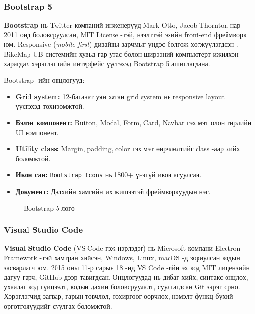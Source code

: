\subsubsection{Bootstrap 5}
\par
\textbf{Bootstrap} нь Twitter компаний инженерүүд Mark Otto, Jacob Thornton нар 2011 онд боловсруулсан, MIT License -тэй, нээлттэй эхийн front-end фреймворк юм. Responsive (\textit{mobile-first}) дизайны зарчмыг үндэс болгож хөгжүүлэгдсэн \cite{bootstrap}. BikeMap UB системийн хувьд гар утас болон ширээний компьютерт ижилхэн харагдах хэрэглэгчийн интерфейс үүсгэхэд Bootstrap 5 ашиглагдана.

\par Bootstrap -ийн онцлогууд:
\begin{itemize}
    \item \textbf{Grid system: }12-баганат уян хатан grid system нь responsive layout үүсгэхэд тохиромжтой.
    \item \textbf{Бэлэн компонент: }Button, Modal, Form, Card, Navbar гэх мэт олон төрлийн UI компонент.
    \item \textbf{Utility class: }Margin, padding, color гэх мэт өөрчлөлтийг class -аар хийх боломжтой.
    \item \textbf{Икон сан: }\texttt{Bootstrap Icons} нь 1800+ үнэгүй икон агуулсан.
    \item \textbf{Документ: }Дэлхийн хамгийн их жишээтэй фреймворкуудын нэг.
\end{itemize}

\begin{figure}[H]
    \centering
    \caption{Bootstrap 5 лого}
    \label{fig:bootstrap-logo}
\end{figure}

\subsubsection{Visual Studio Code}
\par
\textbf{Visual Studio Code} (VS Code гэж нэрлэдэг) нь Microsoft компани Electron Framework -тэй хамтран хийсэн, Windows, Linux, macOS -д зориулсан кодын засварлагч юм. 2015 оны 11-р сарын 18 -нд VS Code -ийн эх код MIT лицензийн дагуу гарч, GitHub дээр тавигдсан. Онцлогуудад нь дибаг хийх, синтакс онцлох, ухаалаг код гүйцээлт, кодын дахин боловсруулалт, суулгагдсан Git зэрэг орно. Хэрэглэгчид загвар, гарын товчлол, тохиргоог өөрчлөх, нэмэлт функц бүхий өргөтгөлүүдийг суулгах боломжтой.

